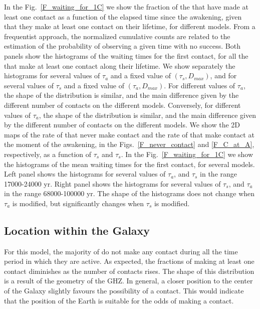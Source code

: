In the Fig.~\ref{F_waiting_for_1C} we show the fraction of the \cetis
that have made at least one contact as a function of the elapsed time
since the awakening, given that they make at least one contact on
their lifetime, for different models.
%
From a frequentist approach, the normalized cumulative counts are
related to the estimation of the probability of observing a given time
with no success.
%             
Both panels show the histograms of the waiting times for the first
contact, for all the \cetis that make at least one contact along their
lifetime.
%
We show separately the histograms for several values of $\tau_a$ and a
fixed value of $(\tau_s, D_{max})$, and for several values of $\tau_s$
and a fixed value of $(\tau_a, D_{max})$.
%
For different values of $\tau_a$, the shape of the distribution is
similar, and the main difference given by the different number of
contacts on the different models.
%
Conversely, for different values of $\tau_a$, the shape of the
distribution is similar, and the main difference given by the
different number of contacts on the different models. 
%
We show the 2D maps of the rate of \cetis that never make contact and
the rate of \cetis that make contact at the moment of the awakening,
in the Figs.~\ref{F_never_contact} and \ref{F_C_at_A}, respectively,
as a function of $\tau_s$ and $\tau_s$.
%
In the Fig.~\ref{F_waiting_for_1C} we show the histograms of the mean
waiting times for the first contact, for several models.
%
Left panel shows the histograms for several values of $\tau_a$, and
$\tau_s$ in the range 17000-24000 yr.
%
Right panel shows the histograms for several values of $\tau_s$, and
$\tau_a$ in the range 68000-100000 yr.
%
The shape of the histograms does not change when $\tau_a$ is modified,
but significantly changes when $\tau_s$ is modified.



\subsection{Location within the Galaxy}\label{SS_location}
    
%
For this model, the majority of \cetis do not make any contact during
all the time period in which they are active.
%
As expected, the fractions of \cetis making at least one contact
diminishes as the number of contacts rises.
%
The shape of this distribution is a result of the geometry of the GHZ.
%
In general, a closer position to the center of the Galaxy slightly
favours the possibility of a contact.
%
This would indicate that the position of the Earth is suitable for the
odds of making a contact.

